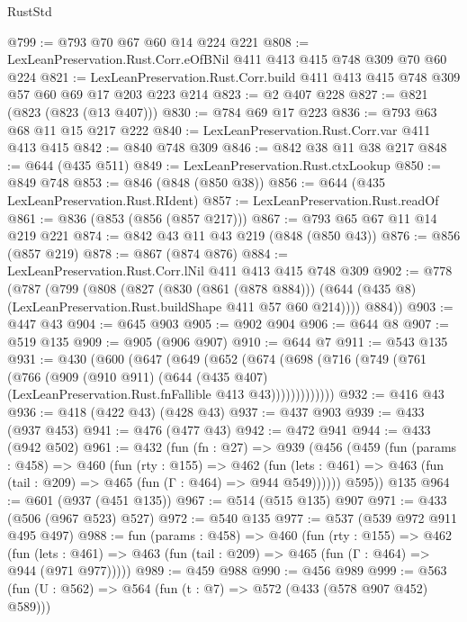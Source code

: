 \begin{lexlean}{RustStd}
\begin{coremodule}
{\begin{coremodule}
{{{{{{@799 := @793 @70 @67 @60 @14 @224 @221
@808 := LexLeanPreservation.Rust.Corr.eOfBNil @411 @413 @415 @748 @309 @70 @60 @224
@821 := LexLeanPreservation.Rust.Corr.build @411 @413 @415 @748 @309 @57 @60 @69 @17 @203 @223 @214
@823 := @2 @407 @228
@827 := @821 (@823 (@823 (@13 @407)))
@830 := @784 @69 @17 @223
@836 := @793 @63 @68 @11 @15 @217 @222
@840 := LexLeanPreservation.Rust.Corr.var @411 @413 @415
@842 := @840 @748 @309
@846 := @842 @38 @11 @38 @217
@848 := @644 (@435 @511)
@849 := LexLeanPreservation.Rust.ctxLookup
@850 := @849 @748
@853 := @846 (@848 (@850 @38))
@856 := @644 (@435 LexLeanPreservation.Rust.RIdent)
@857 := LexLeanPreservation.Rust.readOf
@861 := @836 (@853 (@856 (@857 @217)))
@867 := @793 @65 @67 @11 @14 @219 @221
@874 := @842 @43 @11 @43 @219 (@848 (@850 @43))
@876 := @856 (@857 @219)
@878 := @867 (@874 @876)
@884 := LexLeanPreservation.Rust.Corr.lNil @411 @413 @415 @748 @309
@902 := @778
    (@787
      (@799
        (@808
          (@827
            (@830 (@861 (@878 @884)))
            (@644 (@435 @8) (LexLeanPreservation.Rust.buildShape @411 @57 @60 @214))))
        @884))
@903 := @447 @43
@904 := @645 @903
@905 := @902 @904
@906 := @644 @8
@907 := @519 @135
@909 := @905 (@906 @907)
@910 := @644 @7
@911 := @543 @135
@931 := @430
    (@600
      (@647
        (@649
          (@652
            (@674
              (@698
                (@716
                  (@749
                    (@761
                      (@766
                        (@909
                          (@910 @911)
                          (@644
                            (@435 @407)
                            (LexLeanPreservation.Rust.fnFallible @413 @43)))))))))))))
@932 := @416 @43
@936 := @418 (@422 @43) (@428 @43)
@937 := @437 @903
@939 := @433 (@937 @453)
@941 := @476 (@477 @43)
@942 := @472 @941
@944 := @433 (@942 @502)
@961 := @432
    (fun (fn : @27) =>
    @939
      (@456
        (@459
          (fun (params : @458) =>
          @460
            (fun (rty : @155) =>
            @462
              (fun (lets : @461) =>
              @463 (fun (tail : @209) => @465 (fun (Γ : @464) => @944 @549))))))
        @595))
    @135
@964 := @601 (@937 (@451 @135))
@967 := @514 (@515 @135) @907
@971 := @433 (@506 (@967 @523) @527)
@972 := @540 @135
@977 := @537 (@539 @972 @911 @495 @497)
@988 := fun (params : @458) =>
  @460
    (fun (rty : @155) =>
    @462
      (fun (lets : @461) => @463 (fun (tail : @209) => @465 (fun (Γ : @464) => @944 (@971 @977)))))
@989 := @459 @988
@990 := @456 @989
@999 := @563 (fun (U : @562) => @564 (fun (t : @7) => @572 (@433 (@578 @907 @452) @589)))
}}}}}}
\end{coremodule}}
\end{coremodule}
\end{lexlean}
